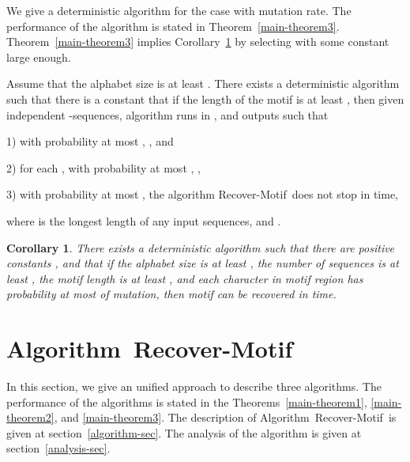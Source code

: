 \documentclass[11pt]{article}
\newtheorem{corollaryfoo}[theoremfoo]{Corollary}
\newenvironment{corollary}{\pagebreak[1]\begin{corollaryfoo}}{\end{corollaryfoo}}
\newcommand{\algmnam}{Recover-Motif}
\newcommand{\algmname}{Algorithm~\algmnam}
\newcommand{\algma}{\algmname~}
\begin{document}
We give a deterministic algorithm for the case with 
mutation rate.  The performance of the algorithm is stated in
Theorem~\ref{main-theorem3}. Theorem~\ref{main-theorem3} implies
Corollary~\ref{corollary3} by selecting  with some
constant  large enough.

\begin{theorem}\label{main-theorem3}Assume that the alphabet size  is at least . There
exists a deterministic
algorithm such that there is a constant  that if the length of
the motif  is at least , then given  independent
-sequences, algorithm runs in , and outputs  such that

1) with probability at most , , and

2) for each , with probability at most
, ,

3)  with probability at most , the algorithm
\algmnam~does not stop in 
time,

 where  is the longest length of any input
sequences, and .
\end{theorem}

\begin{corollary}\label{corollary3}
There exists a deterministic algorithm such that there are positive
constants , and  that if the alphabet size is at
least , the number of sequences is at least , the
motif length is at least , and each character in motif
region has probability at most  of mutation, then motif can
be recovered in  time.
\end{corollary}










\section{\algmname}
In this section, we give an unified approach to describe three
algorithms. The performance of the algorithms is stated in the
Theorems~\ref{main-theorem1}, \ref{main-theorem2}, and
\ref{main-theorem3}. The description of \algma is given at
section~\ref{algorithm-sec}. The analysis of the algorithm is given
at section~\ref{analysis-sec}.
\end{document}
